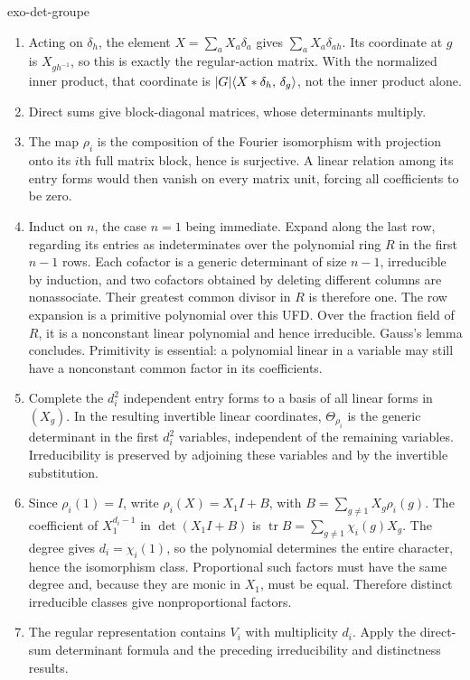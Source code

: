 \begin{correction}{exo-det-groupe}
\begin{enumerate}
\item Acting on $\delta_h$, the element $X=\sum_aX_a\delta_a$ gives
$\sum_aX_a\delta_{ah}$. Its coordinate at $g$ is $X_{gh^{-1}}$, so
this is exactly the regular-action matrix. With the normalized inner
product, that coordinate is $|G|\langle X*\delta_h,\,\delta_g\rangle$, not the
inner product alone.
\item Direct sums give block-diagonal matrices, whose determinants multiply.
\item The map $\rho_i$ is the composition of the Fourier isomorphism
with projection onto its $i$th full matrix block, hence is surjective.
A linear relation among its entry forms would then vanish on every
matrix unit, forcing all coefficients to be zero.
\item Induct on $n$, the case $n=1$ being immediate. Expand along the
last row, regarding its entries as indeterminates over the polynomial
ring $R$ in the first $n-1$ rows. Each cofactor is a generic determinant
of size $n-1$, irreducible by induction, and two cofactors obtained by
deleting different columns are nonassociate. Their greatest common divisor
in $R$ is therefore one. The row expansion is a primitive polynomial
over this UFD. Over the fraction field of $R$, it is a nonconstant
linear polynomial and hence irreducible. Gauss's lemma concludes.
Primitivity is essential: a polynomial linear in a variable may still
have a nonconstant common factor in its coefficients.
\item Complete the $d_i^2$ independent entry forms to a basis of all
linear forms in $(X_g)$. In the resulting invertible linear coordinates,
$\Theta_{\rho_i}$ is the generic determinant in the first $d_i^2$
variables, independent of the remaining variables. Irreducibility is
preserved by adjoining these variables and by the invertible substitution.
\item Since $\rho_i(1)=I$, write $\rho_i(X)=X_1I+B$, with
$B=\sum_{g\ne1}X_g\rho_i(g)$. The coefficient of $X_1^{d_i-1}$ in
$\det(X_1I+B)$ is $\operatorname{tr}B=\sum_{g\ne1}\chi_i(g)X_g$.
The degree gives $d_i=\chi_i(1)$, so the polynomial determines the
entire character, hence the isomorphism class. Proportional such factors
must have the same degree and, because they are monic in $X_1$, must
be equal. Therefore distinct irreducible classes give nonproportional factors.
\item The regular representation contains $V_i$ with multiplicity $d_i$.
Apply the direct-sum determinant formula and the preceding irreducibility
and distinctness results.
\end{enumerate}
\end{correction}


